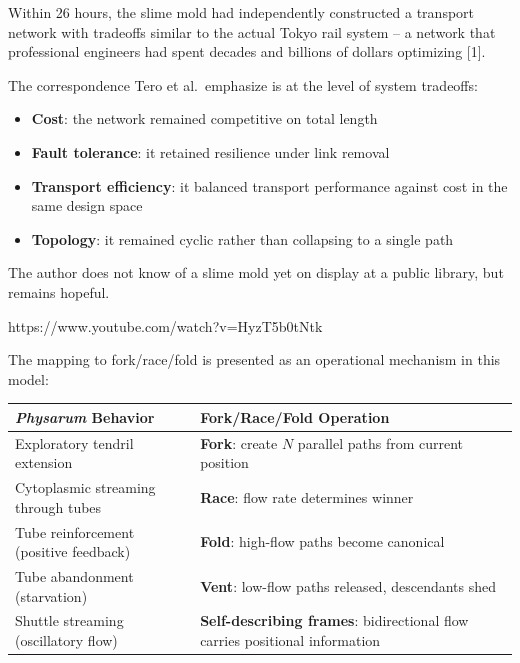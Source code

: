 \documentclass[
  11pt,
]{article}
\newcounter{none} %
\begin{document}
Within 26 hours, the slime mold had independently constructed a
transport network with tradeoffs similar to the actual Tokyo rail system
-- a network that professional engineers had spent decades and billions
of dollars optimizing {[}1{]}.

The correspondence Tero et al.~emphasize is at the level of system
tradeoffs:

\begin{itemize}
\item
  \textbf{Cost}: the network remained competitive on total length
\item
  \textbf{Fault tolerance}: it retained resilience under link removal
\item
  \textbf{Transport efficiency}: it balanced transport performance
  against cost in the same design space
\item
  \textbf{Topology}: it remained cyclic rather than collapsing to a
  single path
\end{itemize}

The author does not know of a slime mold yet on display at a public
library, but remains hopeful.

https://www.youtube.com/watch?v=HyzT5b0tNtk

The mapping to fork/race/fold is presented as an operational mechanism
in this model:

{\def\LTcaptype{none} %
\begin{longtable}[]{@{}
  >{\raggedright\arraybackslash}p{}
  >{\raggedright\arraybackslash}p{}@{}}
\toprule\noalign{}
\begin{minipage}[b]{\linewidth}\raggedright
\emph{Physarum} Behavior
\end{minipage} & \begin{minipage}[b]{\linewidth}\raggedright
Fork/Race/Fold Operation
\end{minipage} \\
\midrule\noalign{}
\endhead
\bottomrule\noalign{}
\endlastfoot
Exploratory tendril extension & \textbf{Fork}: create \(N\) parallel
paths from current position \\
Cytoplasmic streaming through tubes & \textbf{Race}: flow rate
determines winner \\
Tube reinforcement (positive feedback) & \textbf{Fold}: high-flow paths
become canonical \\
Tube abandonment (starvation) & \textbf{Vent}: low-flow paths released,
descendants shed \\
Shuttle streaming (oscillatory flow) & \textbf{Self-describing frames}:
bidirectional flow carries positional information \\
\end{longtable}
}
\end{document}

